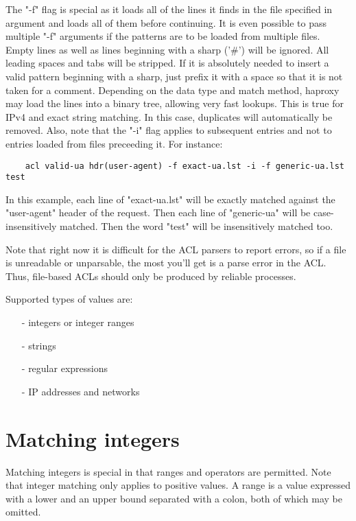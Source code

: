 The "-f" flag is special as it loads all of the lines it finds in the file
specified in argument and loads all of them before continuing. It is even
possible to pass multiple "-f" arguments if the patterns are to be loaded from
multiple files. Empty lines as well as lines beginning with a sharp ('\#') will
be ignored. All leading spaces and tabs will be stripped. If it is absolutely
needed to insert a valid pattern beginning with a sharp, just prefix it with a
space so that it is not taken for a comment. Depending on the data type and
match method, haproxy may load the lines into a binary tree, allowing very fast
lookups. This is true for IPv4 and exact string matching. In this case,
duplicates will automatically be removed. Also, note that the "-i" flag applies
to subsequent entries and not to entries loaded from files preceeding it. For
instance:

\begin{verbatim}
    acl valid-ua hdr(user-agent) -f exact-ua.lst -i -f generic-ua.lst  test
\end{verbatim}

In this example, each line of "exact-ua.lst" will be exactly matched against
the "user-agent" header of the request. Then each line of "generic-ua" will be
case-insensitively matched. Then the word "test" will be insensitively matched
too.

Note that right now it is difficult for the ACL parsers to report errors, so if
a file is unreadable or unparsable, the most you'll get is a parse error in the
ACL. Thus, file-based ACLs should only be produced by reliable processes.

Supported types of values are:
\begin{itemize}
\item[-] integers or integer ranges
\item[-] strings
\item[-] regular expressions
\item[-] IP addresses and networks
\end{itemize}

\section{Matching integers}

Matching integers is special in that ranges and operators are permitted. Note
that integer matching only applies to positive values. A range is a value
expressed with a lower and an upper bound separated with a colon, both of which
may be omitted.

